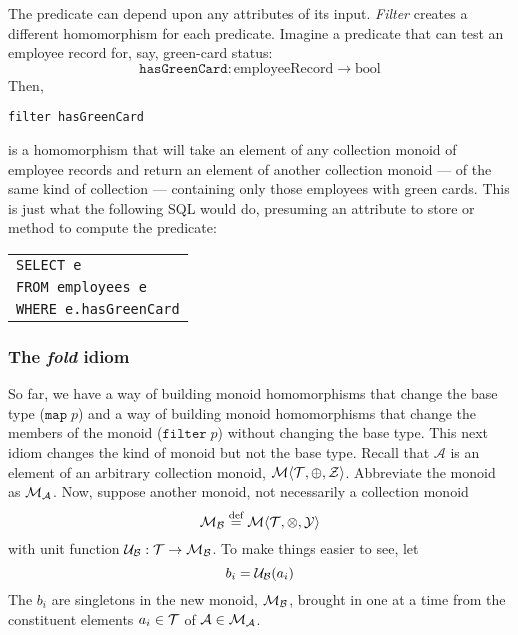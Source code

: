 The predicate can depend upon any attributes of its input. \emph{Filter} creates a different homomorphism for each predicate. Imagine a predicate that can test an employee record for, say, green-card status: \[\mathtt{hasGreenCard}:
\text{employeeRecord}\rightarrow\text{bool}\]
Then, 
\begin{center}
\verb"filter hasGreenCard"
\end{center}
is a homomorphism that will take an element of any collection monoid of employee records and return an element of another collection monoid --- of the same kind of collection --- containing only those employees with green cards. This is just what the following SQL would do, presuming an attribute to store or method to compute the predicate:
\begin{center}
\begin{tabular}{l}
\verb"SELECT e"\\
\verb"FROM employees e"\\
\verb"WHERE e.hasGreenCard"
\end{tabular}
\end{center}


\subsubsection{\color{red}The \emph{fold} idiom}


So far, we have a way of building monoid homomorphisms that change the base type ($\mathtt{map}\;p$) and a way of building monoid homomorphisms that change the members of the monoid ($\mathtt{filter}\;p$) without changing the base type. This next idiom changes the kind of monoid but not the base type. Recall that $\mathcal{A}$ is an element of an arbitrary collection monoid, $\mathcal{M}\langle{\mathcal{T}},{\oplus},{\mathcal{Z}}\rangle$. Abbreviate the monoid as $\mathcal{M}_{\mathcal{A}}$. Now, suppose another monoid, not necessarily a collection monoid $$\mathcal{M}_{\mathcal{B}}\overset{\text{def}}{=}\mathcal{M}\langle{\mathcal{T}},{\otimes},{\mathcal{Y}}\rangle$$
with unit function $\mathcal{U}_{\mathcal{B}}:\mathcal{T}\rightarrow\mathcal{M}_{\mathcal{B}}$. To make things easier to see, let
\begin{equation}
  b_i = \mathcal{U}_{\mathcal{B}}(a_i)
  \label{eqn:monadunit}
\end{equation}
The $b_i$ are singletons in the new monoid, $\mathcal{M}_{\mathcal{B}}$, brought in one at a time from the constituent elements $a_i\in\mathcal{T}$ of $\mathcal{A}\in\mathcal{M}_{\mathcal{A}}$. 


